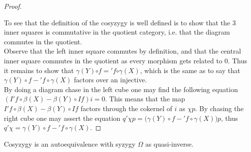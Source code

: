 \begin{proof}
\begin{center}
        \end{center}
        To see that the definition of the cosyzygy is well defined is to show that the 3 inner squares is commutative in the quotient category, i.e. that the diagram commutes in the quotient. \\
        
        Observe that the left inner square commutes by definition, and that the central inner square commutes in the quotient as every morphism gets related to $0$. Thus it remains to show that \underline{$\gamma (Y)$}$\circ$\underline{$f$}$=$\underline{$'f$}$\circ$\underline{$\gamma (X)$}, which is the same as to say that $\gamma (Y)\circ$$f-$$'f\circ\gamma (X)$ factors over an injective. \\
 
        By doing a diagram chase in the left cube one may find the following equation $(I'f\circ \beta(X)-\beta (Y)\circ If)i=0$. This means that the map $I'f\circ \beta(X)-\beta (Y)\circ If$ factors through the cokernel of $i$ as $\chi p$. By chasing the right cube one may assert the equation $q'\chi p = (\gamma (Y)\circ$$f-$$'f\circ\gamma (X))p$, thus $q'\chi =$$\gamma (Y)\circ$$f-$$'f\circ\gamma (X)$.
    \end{proof}

    \begin{corollary}
        Cosyzygy \upside{$\Omega$} is an autoequivalence with syzygy $\Omega$ as quasi-inverse.
    \end{corollary}

